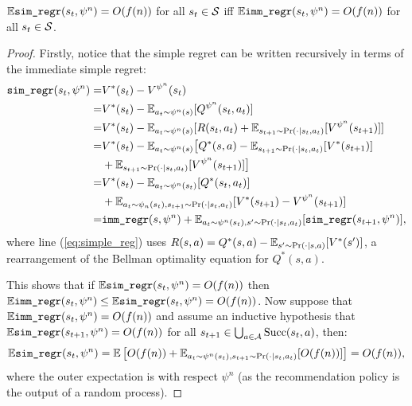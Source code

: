     \begin{lemma} \label{lem:imm_simple_regret}
        $\mathbb{E}{\textnormal{\texttt{sim\_regr}}}(s_t,\psi^n)=O(f(n))$ for all $s_t\in\mathcal{S}$ iff $\mathbb{E}{\textnormal{\texttt{imm\_regr}}}(s_t,\psi^n)=O(f(n))$ for all $s_t\in\mathcal{S}$.
    \end{lemma}
    \begin{proof}
        Firstly, notice that the simple regret can be written recursively in terms of the immediate simple regret:
        \begin{align}
            {\textnormal{\texttt{sim\_regr}}}(s_t,\psi^n) =& V^*(s_t) - V^{\psi^n}(s_t) \\
                =& V^*(s_t) - \mathbb{E}_{a_t\sim\psi^n(s)}[Q^{\psi^n}(s_t,a_t)] \\
                =& V^*(s_t) - \mathbb{E}_{a_t\sim\psi^n(s)}[R(s_t,a_t) +    
                    \mathbb{E}_{s_{t+1}\sim\Pr(\cdot|s_t,a_t)}[V^{\psi^n}(s_{t+1})]] \\
                =& V^*(s_t) - \mathbb{E}_{a_t\sim\psi^n(s)}\big[Q^*(s,a) - 
                    \mathbb{E}_{s_{t+1}\sim\Pr(\cdot|s_t,a_t)}[V^*(s_{t+1})]  \notag \\
                    &+ \mathbb{E}_{s_{t+1}\sim\Pr(\cdot|s_t,a_t)}[V^{\psi^n}(s_{t+1})]\big] \label{eq:simple_reg} \\
                =& V^*(s_t) - \mathbb{E}_{a_t\sim\psi^n(s_t)}[Q^*(s_t,a_t)] \notag \\
                    &+ \mathbb{E}_{a_t\sim\psi_n(s_t),s_{t+1}\sim\Pr(\cdot|s_t,a_t)}[
                        V^*(s_{t+1}) - V^{\psi^n}(s_{t+1})] \\
                =& {\textnormal{\texttt{imm\_regr}}}(s,\psi^n) + 
                    \mathbb{E}_{a_t\sim\psi^n(s_t),s'\sim\Pr(\cdot|s_t,a_t)}[{\textnormal{\texttt{sim\_regr}}}(s_{t+1},\psi^n)], \label{eq:regret_relation}
        \end{align}
        where line (\ref{eq:simple_reg}) uses $R(s,a) = Q^*(s,a) - \mathbb{E}_{s'\sim\Pr(\cdot|s,a)}[V^*(s')]$, a rearrangement of the Bellman optimality equation for $Q^*(s,a)$.
        
        This shows that if $\mathbb{E}{\textnormal{\texttt{sim\_regr}}}(s_t,\psi^n)=O(f(n))$ then $\mathbb{E}{\textnormal{\texttt{imm\_regr}}}(s_t,\psi^n)\leq \mathbb{E}{\textnormal{\texttt{sim\_regr}}}(s_t,\psi^n) = O(f(n))$. Now suppose that $\mathbb{E}{\textnormal{\texttt{imm\_regr}}}(s_t,\psi^n)=O(f(n))$ and assume an inductive hypothesis that $\mathbb{E}{\textnormal{\texttt{sim\_regr}}}(s_{t+1},\psi^n)=O(f(n))$ for all $s_{t+1}\in\bigcup_{a\in\mathcal{A}}{\textnormal{Succ}(s_t,a)}$, then:
        \begin{align}
            \mathbb{E}{\textnormal{\texttt{sim\_regr}}}(s_t,\psi^n) = \mathbb{E}\left[ O(f(n)) + \mathbb{E}_{a_t\sim\psi^n(s_t),s_{t+1}\sim\Pr(\cdot|s_t,a_t)}[O(f(n))] \right] = O(f(n)),
        \end{align}
        where the outer expectation is with respect $\psi^n$ (as the recommendation policy is the output of a random process).
    \end{proof}





